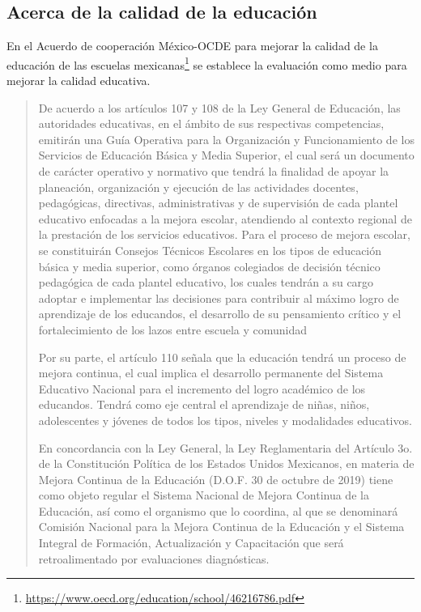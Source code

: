 \documentclass[
  12,
]{scrartcl}
\DeclareRobustCommand{\href}[2]{#2\footnote{\url{#1}}}
\begin{document}
\hypertarget{acerca-de-la-calidad-de-la-educaciuxf3n}{%
\subsection{Acerca de la calidad de la
educación}\label{acerca-de-la-calidad-de-la-educaciuxf3n}}

En el \href{https://www.oecd.org/education/school/46216786.pdf}{Acuerdo
de cooperación México-OCDE para mejorar la calidad de la educación de
las escuelas mexicanas} se establece la evaluación como medio para
mejorar la calidad educativa.

\begin{quote}
De acuerdo a los artículos 107 y 108 de la Ley General de Educación, las
autoridades educativas, en el ámbito de sus respectivas competencias,
emitirán una Guía Operativa para la Organización y Funcionamiento de los
Servicios de Educación Básica y Media Superior, el cual será un
documento de carácter operativo y normativo que tendrá la finalidad de
apoyar la planeación, organización y ejecución de las actividades
docentes, pedagógicas, directivas, administrativas y de supervisión de
cada plantel educativo enfocadas a la mejora escolar, atendiendo al
contexto regional de la prestación de los servicios educativos. Para el
proceso de mejora escolar, se constituirán Consejos Técnicos Escolares
en los tipos de educación básica y media superior, como órganos
colegiados de decisión técnico pedagógica de cada plantel educativo, los
cuales tendrán a su cargo adoptar e implementar las decisiones para
contribuir al máximo logro de aprendizaje de los educandos, el
desarrollo de su pensamiento crítico y el fortalecimiento de los lazos
entre escuela y comunidad

Por su parte, el artículo 110 señala que la educación tendrá un proceso
de mejora continua, el cual implica el desarrollo permanente del Sistema
Educativo Nacional para el incremento del logro académico de los
educandos. Tendrá como eje central el aprendizaje de niñas, niños,
adolescentes y jóvenes de todos los tipos, niveles y modalidades
educativos.

En concordancia con la Ley General, la Ley Reglamentaria del Artículo
3o. de la Constitución Política de los Estados Unidos Mexicanos, en
materia de Mejora Continua de la Educación (D.O.F. 30 de octubre de
2019) tiene como objeto regular el Sistema Nacional de Mejora Continua
de la Educación, así como el organismo que lo coordina, al que se
denominará Comisión Nacional para la Mejora Continua de la Educación y
el Sistema Integral de Formación, Actualización y Capacitación que será
retroalimentado por evaluaciones diagnósticas.


\end{quote}
\end{document}
